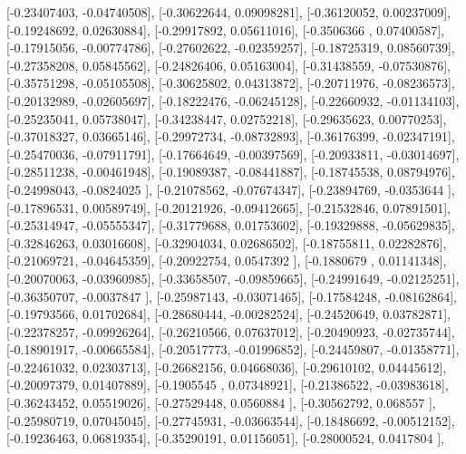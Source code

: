 \documentclass{article}
\begin{document}
       [-0.23407403, -0.04740508],
       [-0.30622644,  0.09098281],
       [-0.36120052,  0.00237009],
       [-0.19248692,  0.02630884],
       [-0.29917892,  0.05611016],
       [-0.3506366 ,  0.07400587],
       [-0.17915056, -0.00774786],
       [-0.27602622, -0.02359257],
       [-0.18725319,  0.08560739],
       [-0.27358208,  0.05845562],
       [-0.24826406,  0.05163004],
       [-0.31438559, -0.07530876],
       [-0.35751298, -0.05105508],
       [-0.30625802,  0.04313872],
       [-0.20711976, -0.08236573],
       [-0.20132989, -0.02605697],
       [-0.18222476, -0.06245128],
       [-0.22660932, -0.01134103],
       [-0.25235041,  0.05738047],
       [-0.34238447,  0.02752218],
       [-0.29635623,  0.00770253],
       [-0.37018327,  0.03665146],
       [-0.29972734, -0.08732893],
       [-0.36176399, -0.02347191],
       [-0.25470036, -0.07911791],
       [-0.17664649, -0.00397569],
       [-0.20933811, -0.03014697],
       [-0.28511238, -0.00461948],
       [-0.19089387, -0.08441887],
       [-0.18745538,  0.08794976],
       [-0.24998043, -0.0824025 ],
       [-0.21078562, -0.07674347],
       [-0.23894769, -0.0353644 ],
       [-0.17896531,  0.00589749],
       [-0.20121926, -0.09412665],
       [-0.21532846,  0.07891501],
       [-0.25314947, -0.05555347],
       [-0.31779688,  0.01753602],
       [-0.19329888, -0.05629835],
       [-0.32846263,  0.03016608],
       [-0.32904034,  0.02686502],
       [-0.18755811,  0.02282876],
       [-0.21069721, -0.04645359],
       [-0.20922754,  0.0547392 ],
       [-0.1880679 ,  0.01141348],
       [-0.20070063, -0.03960985],
       [-0.33658507, -0.09859665],
       [-0.24991649, -0.02125251],
       [-0.36350707, -0.0037847 ],
       [-0.25987143, -0.03071465],
       [-0.17584248, -0.08162864],
       [-0.19793566,  0.01702684],
       [-0.28680444, -0.00282524],
       [-0.24520649,  0.03782871],
       [-0.22378257, -0.09926264],
       [-0.26210566,  0.07637012],
       [-0.20490923, -0.02735744],
       [-0.18901917, -0.00665584],
       [-0.20517773, -0.01996852],
       [-0.24459807, -0.01358771],
       [-0.22461032,  0.02303713],
       [-0.26682156,  0.04668036],
       [-0.29610102,  0.04445612],
       [-0.20097379,  0.01407889],
       [-0.1905545 ,  0.07348921],
       [-0.21386522, -0.03983618],
       [-0.36243452,  0.05519026],
       [-0.27529448,  0.0560884 ],
       [-0.30562792,  0.068557  ],
       [-0.25980719,  0.07045045],
       [-0.27745931, -0.03663544],
       [-0.18486692, -0.00512152],
       [-0.19236463,  0.06819354],
       [-0.35290191,  0.01156051],
       [-0.28000524,  0.0417804 ],
\end{document}
